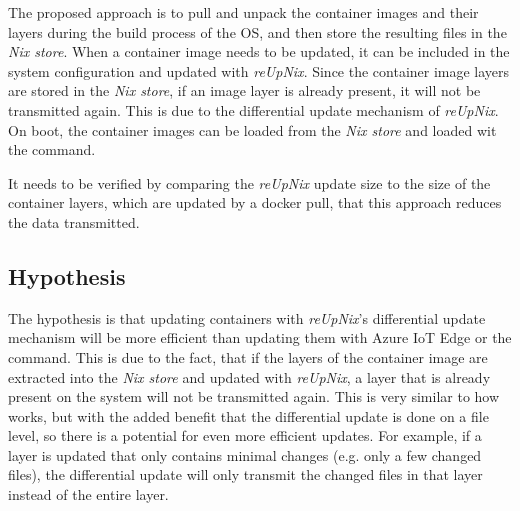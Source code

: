 The proposed approach is to pull and unpack the container images and their layers
during the build
process of the \ac{OS}, and then store the resulting files in the
\textit{Nix store}. When a container image needs to be updated, it can
be included in the system configuration and updated with \textit{reUpNix}.
Since the container image layers are stored in the \textit{Nix store}, if an
image layer is already present, it will not be transmitted again. This is due
to the differential update mechanism of \textit{reUpNix}.
On boot, the container images can be loaded from the \textit{Nix store} and
loaded wit the  command.

It needs to be verified by comparing the \textit{reUpNix} update size to the size
of the container layers,
which are updated by a docker pull, that this approach reduces the data transmitted.

\subsection{Hypothesis}
The hypothesis is that updating containers with \textit{reUpNix}'s differential
update mechanism will be more efficient than updating them with Azure IoT Edge or
the  command. This is due to the fact, that if the
layers of the container image are extracted into the \textit{Nix store} and
updated with \textit{reUpNix}, a layer that is already present on the system
will not be transmitted again. This is very similar to how 
works, but with the added benefit that the differential update is done on a
file level, so there is a potential for even more efficient updates. For example,
if a layer is updated that only contains minimal changes (e.g. only a few
changed files), the differential update will only transmit the changed files in
that layer instead of the entire layer.
